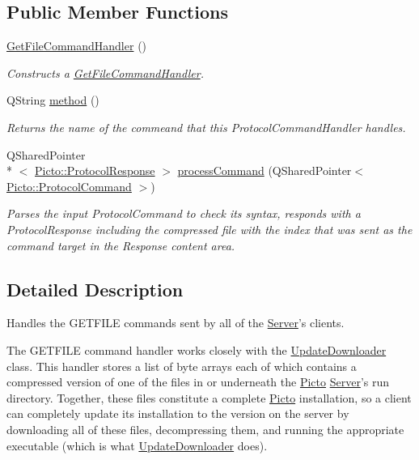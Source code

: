 \subsection*{Public Member Functions}
\begin{DoxyCompactItemize}
\item 
\hyperlink{struct_get_file_command_handler_a29c87a6457e5980e31ed6ec1a06ef726}{Get\-File\-Command\-Handler} ()
\begin{DoxyCompactList}\small\item\em Constructs a \hyperlink{struct_get_file_command_handler}{Get\-File\-Command\-Handler}. \end{DoxyCompactList}\item 
\hypertarget{struct_get_file_command_handler_a847ae1af28c6a51c8a4ba8b0a85f4077}{Q\-String \hyperlink{struct_get_file_command_handler_a847ae1af28c6a51c8a4ba8b0a85f4077}{method} ()}\label{struct_get_file_command_handler_a847ae1af28c6a51c8a4ba8b0a85f4077}

\begin{DoxyCompactList}\small\item\em Returns the name of the commeand that this Protocol\-Command\-Handler handles. \end{DoxyCompactList}\item 
Q\-Shared\-Pointer\\*
$<$ \hyperlink{struct_picto_1_1_protocol_response}{Picto\-::\-Protocol\-Response} $>$ \hyperlink{struct_get_file_command_handler_a30b0e0ab89c22075878ed1fa39ac806d}{process\-Command} (Q\-Shared\-Pointer$<$ \hyperlink{struct_picto_1_1_protocol_command}{Picto\-::\-Protocol\-Command} $>$)
\begin{DoxyCompactList}\small\item\em Parses the input Protocol\-Command to check its syntax, responds with a Protocol\-Response including the compressed file with the index that was sent as the command target in the Response content area. \end{DoxyCompactList}\end{DoxyCompactItemize}


\subsection{Detailed Description}
Handles the G\-E\-T\-F\-I\-L\-E commands sent by all of the \hyperlink{class_server}{Server}'s clients. 

The G\-E\-T\-F\-I\-L\-E command handler works closely with the \hyperlink{class_update_downloader}{Update\-Downloader} class. This handler stores a list of byte arrays each of which contains a compressed version of one of the files in or underneath the \hyperlink{namespace_picto}{Picto} \hyperlink{class_server}{Server}'s run directory. Together, these files constitute a complete \hyperlink{namespace_picto}{Picto} installation, so a client can completely update its installation to the version on the server by downloading all of these files, decompressing them, and running the appropriate executable (which is what \hyperlink{class_update_downloader}{Update\-Downloader} does).

